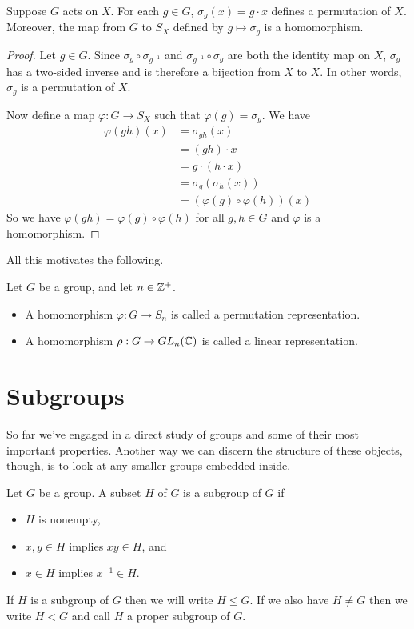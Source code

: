 \documentclass[../m171main.tex]{subfiles}
\begin{document}
\begin{theorem}[]
    Suppose $G$ acts on $X$.
    For each $g \in G$, $\sigma_g(x) = g \cdot x$ defines a permutation of $X$.
    Moreover, the map from $G$ to $S_X$ defined by $g \mapsto \sigma_g$ is a homomorphism.
\end{theorem}

\begin{proof}
    Let $g \in G$.
    Since $\sigma_g \circ \sigma_{g^{-1}}$ and $\sigma_{g^{-1}} \circ \sigma_g$ are both the identity map on $X$, $\sigma_g$ has a two-sided inverse and is therefore a bijection from $X$ to $X$.
    In other words, $\sigma_g$ is a permutation of $X$.

    Now define a map $\varphi : G \to S_X$ such that $\varphi(g) = \sigma_g$.
    We have
    \begin{align*}
        \varphi(gh) (x) &= \sigma_{gh}(x) \\
        &= (gh) \cdot x \\
        &= g \cdot (h \cdot x) \\
        &= \sigma_g (\sigma_h (x)) \\
        &= \left( \varphi(g) \circ \varphi(h) \right)(x)
    \end{align*}
    So we have $\varphi(gh) = \varphi(g) \circ \varphi(h)$ for all $g,h \in G$ and $\varphi$ is a homomorphism.
\end{proof}

All this motivates the following.

\begin{definition}[Representation]
    Let $G$ be a group, and let $n \in \mathbb{Z}^+$.
    \begin{itemize}
        \item A homomorphism $\varphi : G \to S_n$ is called a permutation representation.
        \item A homomorphism $\rho : G \to GL_n(\mathbb{C})$ is called a linear representation.
    \end{itemize}
\end{definition}

\section{Subgroups}
So far we've engaged in a direct study of groups and some of their most important properties.
Another way we can discern the structure of these objects, though, is to look at any smaller groups embedded inside.

\begin{definition}[Subgroup]
    Let $G$ be a group.
    A subset $H$ of $G$ is a subgroup of $G$ if
    \begin{itemize}
        \item $H$ is nonempty,
        \item $x,y \in H$ implies $xy \in H$, and
        \item $x \in H$ implies $x^{-1} \in H$.
    \end{itemize}
    If $H$ is a subgroup of $G$ then we will write $H \leq G$.
    If we also have $H \neq G$ then we write $H < G$ and call $H$ a proper subgroup of $G$.
\end{definition}
\end{document}
